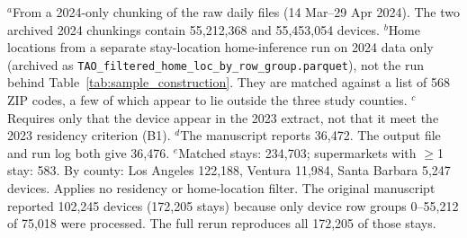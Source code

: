 \begin{table}[ht]
\vspace{4pt}
\parbox{0.95\textwidth}{\footnotesize
$^{a}$From a 2024-only chunking of the raw daily files (14 Mar--29 Apr 2024). The two archived 2024 chunkings contain 55,212,368 and 55,453,054 devices.
$^{b}$Home locations from a separate stay-location home-inference run on 2024 data only (archived as \texttt{TAO\_filtered\_home\_loc\_by\_row\_group.parquet}), not the run behind Table~\ref{tab:sample_construction}. They are matched against a list of 568 ZIP codes, a few of which appear to lie outside the three study counties.
$^{c}$Requires only that the device appear in the 2023 extract, not that it meet the 2023 residency criterion (B1).
$^{d}$The manuscript reports 36,472. The output file and run log both give 36,476.
$^{e}$Matched stays: 234,703; supermarkets with $\geq$1 stay: 583. By county: Los Angeles 122,188, Ventura 11,984, Santa Barbara 5,247 devices. Applies no residency or home-location filter. The original manuscript reported 102,245 devices (172,205 stays) because only device row groups 0--55,212 of 75,018 were processed. The full rerun reproduces all 172,205 of those stays.}
\end{table}
